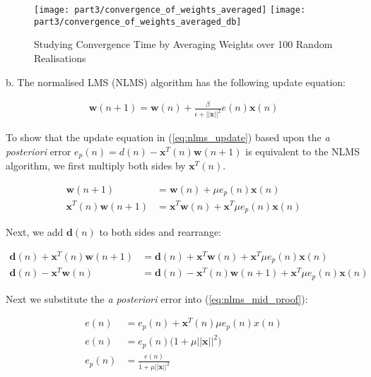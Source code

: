 \begin{figure}[H]
\centering{}
\texttt{[image: part3/convergence\_of\_weights\_averaged]}
\texttt{[image: part3/convergence\_of\_weights\_averaged\_db]}
\caption{Studying Convergence Time by Averaging Weights over 100 Random Realisations}
\end{figure}


\noindent{}b. The normalised LMS (NLMS) algorithm has the following update equation:

\begin{align}
\textbf{w}(n+1) = \textbf{w}(n) + \frac{\beta}{\epsilon + ||\textbf{x}||^2} e(n)\textbf{x}(n)\label{eq:nlms_algo}
\end{align}

\noindent{}To show that the update equation in (\ref{eq:nlms_update}) based upon the \textit{a posteriori} error $e_p(n)=d(n)-\textbf{x}^T(n)\textbf{w}(n+1)$ is equivalent to the NLMS algorithm, we first multiply both sides by $\textbf{x}^T(n)$. 

\begin{align}
\textbf{w}(n+1) &= \textbf{w}(n) + \mu e_p(n)\textbf{x}(n) \label{eq:nlms_update}\\
\textbf{x}^T(n)\textbf{w}(n+1) &= \textbf{x}^T\textbf{w}(n) + \textbf{x}^T \mu e_p(n) \textbf{x}(n) \nonumber
\end{align}

\noindent{}Next, we add $\textbf{d}(n)$ to both sides and rearrange:

\begin{align}
\textbf{d}(n)+\textbf{x}^T(n)\textbf{w}(n+1) &= \textbf{d}(n)+\textbf{x}^T\textbf{w}(n) + \textbf{x}^T \mu e_p(n) \textbf{x}(n) \nonumber\\
\textbf{d}(n)-\textbf{x}^T\textbf{w}(n) &= \textbf{d}(n)-\textbf{x}^T(n)\textbf{w}(n+1) + \textbf{x}^T \mu e_p(n) \textbf{x}(n)\label{eq:nlms_mid_proof}
\end{align}

\noindent{}Next we substitute the \textit{a posteriori} error into (\ref{eq:nlms_mid_proof}):

\begin{align}
e(n) &= e_p(n) + \textbf{x}^T(n) \mu e_p(n) x(n) \nonumber\\
e(n) &= e_p(n) \bigg(1+\mu ||\textbf{x}||^2\bigg) \nonumber\\
e_p(n) &= \frac{e(n)}{1+\mu||\textbf{x}||^2} \label{eq:a_posteriori_error}
\end{align}


